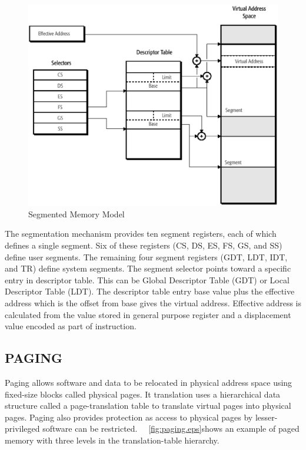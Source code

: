 \begin{figure}[H]
\centering
\includegraphics[scale=0.5]{./figures/segmentation.eps}
\caption{Segmented Memory Model}
\label{fig:segmentation.eps}
\end{figure}


The segmentation mechanism provides ten segment registers, each of which defines a single segment. Six of these registers (CS, DS, ES, FS, GS, and SS) define user segments. The remaining four segment registers (GDT, LDT, IDT, and TR) define system segments. The segment selector points toward a specific entry in descriptor table. This can be Global Descriptor Table (GDT) or Local Descriptor Table (LDT). The descriptor table entry base value plus the effective address which is the offset from base gives the virtual address. Effective address is calculated from the value stored in general purpose register and a displacement value encoded as part of instruction.

\subsection{PAGING}
Paging allows software and data to be relocated in physical address space using fixed-size blocks called physical pages. It translation uses a hierarchical data structure called a page-translation table to translate virtual pages into physical pages. Paging also provides protection as access to physical pages by lesser-privileged software can be restricted. ~\figurename{~\ref{fig:paging.eps}}shows an example of paged memory with three levels in the translation-table hierarchy. 




